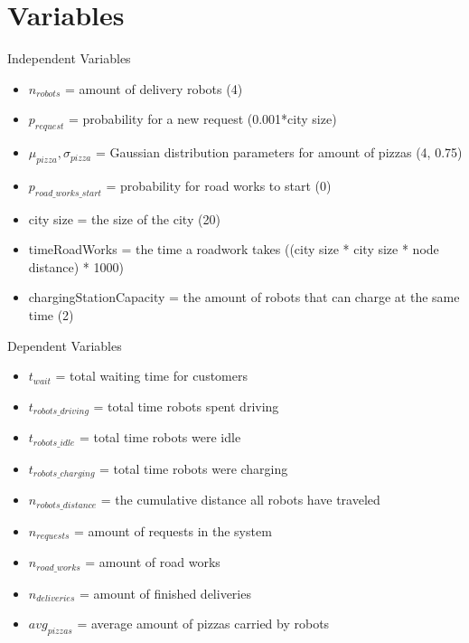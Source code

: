 \section{Variables}
\begin{frame}{Independent Variables}
    \begin{itemize}
        \item $n_{robots}$ = amount of delivery robots (4)
        \item $p_{request}$ = probability for a new request (0.001*city size)
        \item $\mu_{pizza}, \sigma_{pizza}$ = Gaussian distribution parameters for amount of pizzas (4, 0.75)
        \item $p_{road\_works\_start}$ = probability for road works to start (0)
        \item city size = the size of the city (20)
        \item timeRoadWorks = the time a roadwork takes ((city size * city size * node distance) * 1000)
        \item chargingStationCapacity = the amount of robots that can charge at the same time (2)
    \end{itemize}
\end{frame}

\begin{frame}{Dependent Variables}
    \begin{itemize}
        \item $t_{wait}$ = total waiting time for customers                             %
        \item $t_{robots\_driving}$ = total time robots spent driving                   %
        \item $t_{robots\_idle}$ = total time robots were idle                          %
        \item $t_{robots\_charging}$ = total time robots were charging                  %
        \item $n_{robots\_distance}$ = the cumulative distance all robots have traveled %
        \item $n_{requests}$ = amount of requests in the system                         %
        \item $n_{road\_works}$ = amount of road works                                  %
        \item $n_{deliveries}$ = amount of finished deliveries  %
        \item $avg_{pizzas}$ = average amount of pizzas carried by robots               %
    \end{itemize}
\end{frame}

